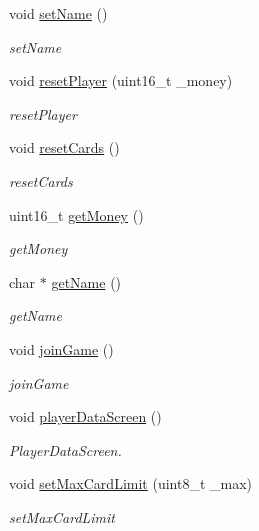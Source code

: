 \begin{DoxyCompactItemize}
void \hyperlink{classplayer_aa0c13334b1c7bdea35078918fb3198e5}{set\-Name} ()
\begin{DoxyCompactList}\small\item\em set\-Name \end{DoxyCompactList}\item 
void \hyperlink{classplayer_a928c08e1f2c4a6d3bf7be82b51c6eba4}{reset\-Player} (uint16\-\_\-t \-\_\-money)
\begin{DoxyCompactList}\small\item\em reset\-Player \end{DoxyCompactList}\item 
void \hyperlink{classplayer_aa1f3e7d1db58e0756f36ed2e8a888569}{reset\-Cards} ()
\begin{DoxyCompactList}\small\item\em reset\-Cards \end{DoxyCompactList}\item 
uint16\-\_\-t \hyperlink{classplayer_a6c1cafca4e7eed2b73a49090f317695d}{get\-Money} ()
\begin{DoxyCompactList}\small\item\em get\-Money \end{DoxyCompactList}\item 
char $\ast$ \hyperlink{classplayer_af8419278f66879cf2758c17d84926095}{get\-Name} ()
\begin{DoxyCompactList}\small\item\em get\-Name \end{DoxyCompactList}\item 
void \hyperlink{classplayer_a2543237dd3945feaa342d5339a94e105}{join\-Game} ()
\begin{DoxyCompactList}\small\item\em join\-Game \end{DoxyCompactList}\item 
void \hyperlink{classplayer_a6f1fbcea3d7a24b52ca38894a2b06b39}{player\-Data\-Screen} ()
\begin{DoxyCompactList}\small\item\em Player\-Data\-Screen. \end{DoxyCompactList}\item 
void \hyperlink{classplayer_a448ed007acc9b0d0dd9f87afa24b761b}{set\-Max\-Card\-Limit} (uint8\-\_\-t \-\_\-max)
\begin{DoxyCompactList}\small\item\em set\-Max\-Card\-Limit \end{DoxyCompactList}\item 

\end{DoxyCompactItemize}
